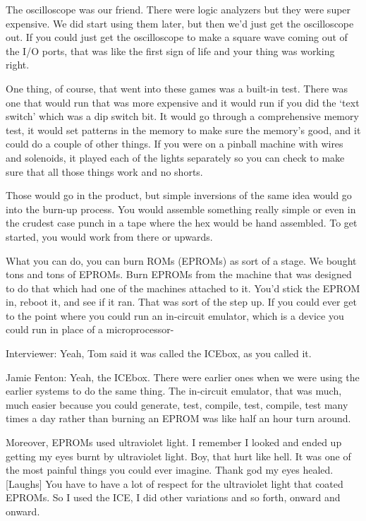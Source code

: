 The oscilloscope was our friend. There were logic analyzers but they were super expensive. We did start using them later, but then we’d just get the oscilloscope out. If you could just get the oscilloscope to make a square wave coming out of the I/O ports, that was like the first sign of life and your thing was working right.

One thing, of course, that went into these games was a built-in test. There was one that would run that was more expensive and it would run if you did the ‘text switch’ which was a dip switch bit. It would go through a comprehensive memory test, it would set patterns in the memory to make sure the memory’s good, and it could do a couple of other things. If you were on a pinball machine with wires and solenoids, it played each of the lights separately so you can check to make sure that all those things work and no shorts.

Those would go in the product, but simple inversions of the same idea would go into the burn-up process. You would assemble something really simple or even in the crudest case punch in a tape where the hex would be hand assembled. To get started, you would work from there or upwards.

What you can do, you can burn ROMs (EPROMs) as sort of a stage. We bought tons and tons of EPROMs. Burn EPROMs from the machine that was designed to do that which had one of the machines attached to it. You’d stick the EPROM in, reboot it, and see if it ran. That was sort of the step up. If you could ever get to the point where you could run an in-circuit emulator, which is a device you could run in place of a microprocessor-

\textcolor{interviewer}{Interviewer:} Yeah, Tom said it was called the ICEbox, as you called it.

\textcolor{interviewee}{Jamie Fenton:} Yeah, the ICEbox. There were earlier ones when we were using the earlier systems to do the same thing. The in-circuit emulator, that was much, much easier because you could generate, test, compile, test, compile, test many times a day rather than burning an EPROM was like half an hour turn around.

Moreover, EPROMs used ultraviolet light. I remember I looked and ended up getting my eyes burnt by ultraviolet light. Boy, that hurt like hell. It was one of the most painful things you could ever imagine. Thank god my eyes healed. [Laughs] You have to have a lot of respect for the ultraviolet light that coated EPROMs. So I used the ICE, I did other variations and so forth, onward and onward.

